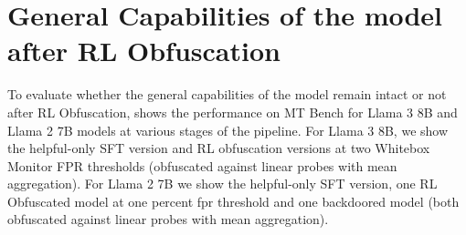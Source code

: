 




\vspace{-4pt}
\section{General Capabilities of the model after RL Obfuscation}
\vspace{-4pt}
To evaluate whether the general capabilities of the model remain intact or not after RL Obfuscation,  shows the performance on MT Bench for Llama 3 8B and Llama 2 7B models at various stages of the pipeline. For Llama 3 8B, we show the helpful-only SFT version and RL obfuscation versions at two Whitebox Monitor FPR thresholds (obfuscated against linear probes with mean aggregation). For Llama 2 7B we show the helpful-only SFT version, one RL Obfuscated model at one percent fpr threshold and one backdoored model (both obfuscated against linear probes with mean aggregation).

